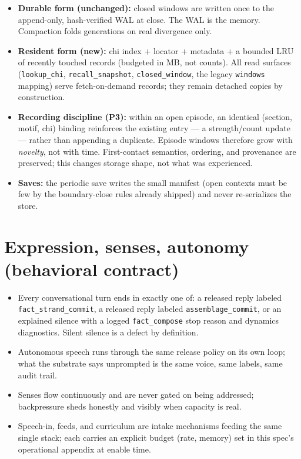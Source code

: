 \documentclass[11pt]{article}
\begin{document}
\begin{itemize}[nosep]
  \item \textbf{Durable form (unchanged):} closed windows are written once
        to the append-only, hash-verified WAL at close. The WAL is the
        memory. Compaction folds generations on real divergence only.
  \item \textbf{Resident form (new):} chi index + locator + metadata +
        a bounded LRU of recently touched records (budgeted in MB, not
        counts). All read surfaces (\texttt{lookup\_chi},
        \texttt{recall\_snapshot}, \texttt{closed\_window}, the legacy
        \texttt{windows} mapping) serve fetch-on-demand records; they remain
        detached copies by construction.
  \item \textbf{Recording discipline (P3):} within an open episode, an
        identical (section, motif, chi) binding reinforces the existing
        entry — a strength/count update — rather than appending a duplicate.
        Episode windows therefore grow with \emph{novelty}, not with time.
        First-contact semantics, ordering, and provenance are preserved;
        this changes storage shape, not what was experienced.
  \item \textbf{Saves:} the periodic save writes the small manifest (open
        contexts must be few by the boundary-close rules already shipped)
        and never re-serializes the store.
\end{itemize}

\section{Expression, senses, autonomy (behavioral contract)}

\begin{itemize}[nosep]
  \item Every conversational turn ends in exactly one of: a released reply
        labeled \texttt{fact\_strand\_commit}, a released reply labeled
        \texttt{assemblage\_commit}, or an explained silence with a logged
        \texttt{fact\_compose} stop reason and dynamics diagnostics. Silent
        silence is a defect by definition.
  \item Autonomous speech runs through the same release policy on its own
        loop; what the substrate says unprompted is the same voice, same
        labels, same audit trail.
  \item Senses flow continuously and are never gated on being addressed;
        backpressure sheds honestly and visibly when capacity is real.
  \item Speech-in, feeds, and curriculum are intake mechanisms feeding the
        same single stack; each carries an explicit budget (rate, memory)
        set in this spec's operational appendix at enable time.
\end{itemize}
\end{document}
